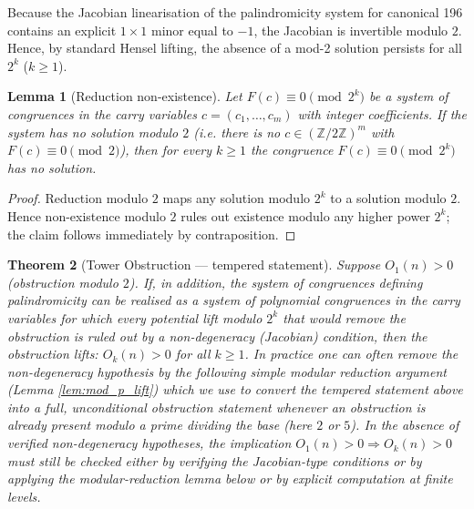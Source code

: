 \documentclass[12pt,a4paper]{article}
\newtheorem{theorem}{Theorem}[section]
\newtheorem{lemma}[theorem]{Lemma}
\begin{document}
Because the Jacobian linearisation of the palindromicity system for canonical 196 contains an explicit $1\times1$ minor equal to $-1$, the Jacobian is invertible modulo $2$. Hence, by standard Hensel lifting, the absence of a mod-2 solution persists for all $2^{k}$ ($k\ge 1$).
\begin{lemma}[Reduction non-existence]
Let $F(c)\equiv 0\pmod{2^k}$ be a system of congruences in the carry variables $c=(c_1,\dots,c_m)$ with integer coefficients. If the system has no solution modulo $2$ (i.e. there is no $c\in(\mathbb Z/2\mathbb Z)^m$ with $F(c)\equiv0\pmod 2$), then for every $k\ge1$ the congruence $F(c)\equiv0\pmod{2^k}$ has no solution.
\end{lemma}

\begin{proof}
Reduction modulo $2$ maps any solution modulo $2^k$ to a solution modulo $2$. Hence non-existence modulo $2$ rules out existence modulo any higher power $2^k$; the claim follows immediately by contraposition.
\end{proof}

\begin{theorem}[Tower Obstruction --- tempered statement]%
Suppose $O_1(n) > 0$ (obstruction modulo $2$). If, in addition, the system of congruences defining palindromicity can be realised as a system of polynomial congruences in the carry variables for which every potential lift modulo $2^k$ that would remove the obstruction is ruled out by a non-degeneracy (Jacobian) condition, then the obstruction lifts: $O_k(n) > 0$ for all $k\ge 1$.
In practice one can often remove the non-degeneracy hypothesis by the following simple modular reduction argument (Lemma \ref{lem:mod_p_lift}) which we use to convert the tempered statement above into a full, unconditional obstruction statement whenever an obstruction is already present modulo a prime dividing the base (here $2$ or $5$).
In the absence of verified non-degeneracy hypotheses, the implication $O_1(n)>0 \Rightarrow O_k(n)>0$ must still be checked either by verifying the Jacobian-type conditions or by applying the modular-reduction lemma below or by explicit computation at finite levels.
\end{theorem}
\end{document}
